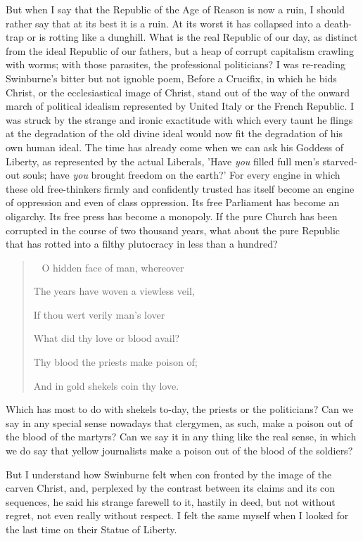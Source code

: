 \documentclass{book}
\newenvironment{mdblockquote}{%
  \begin{quotation}
    \
}{%
  \end{quotation}
}
\begin{document}
But when I say that the Republic of the Age of Reason is now a ruin, I should rather say that at its best it is a ruin. At its worst it has collapsed into a death-trap or is rotting like a dunghill. What is the real Republic of our day, as distinct from the ideal Republic of our fathers, but a heap of corrupt capitalism crawling with worms; with those parasites, the professional politicians? I was re-reading Swinburne’s bitter but not ignoble poem, Before a Crucifix, in which he bids Christ, or the ecclesiastical image of Christ, stand out of the way of the onward march of political idealism represented by United Italy or the French Republic. I was struck by the strange and ironic exactitude with which every taunt he flings at the degradation of the old divine ideal would now fit the degradation of his own human ideal. The time has already come when we can ask his Goddess of Liberty, as represented by the actual Liberals, ’Have \emph{you} filled full men’s starved-out souls; have \emph{you} brought freedom on the earth?’ For every engine in which these old free-thinkers firmly and confidently trusted has itself become an engine of oppression and even of class oppression. Its free Parliament has become an oligarchy. Its free press has become a monopoly. If the pure Church has been corrupted in the course of two thousand years, what about the pure Republic that has rotted into a filthy plutocracy in less than a hundred?

\begin{mdblockquote}
	O hidden face of man, whereover

	The years have woven a viewless veil,

	If thou wert verily man’s lover

	What did thy love or blood avail?

	Thy blood the priests make poison of;

	And in gold shekels coin thy love.


\end{mdblockquote}
Which has most to do with shekels to-day, the priests or the politicians? Can we say in any special sense nowadays that clergymen, as such, make a poison out of the blood of the martyrs? Can we say it in any thing like the real sense, in which we do say that yellow journalists make a poison out of the blood of the soldiers?

But I understand how Swinburne felt when con fronted by the image of the carven Christ, and, perplexed by the contrast between its claims and its con sequences, he said his strange farewell to it, hastily in deed, but not without regret, not even really without respect. I felt the same myself when I looked for the last time on their Statue of Liberty.
\end{document}
